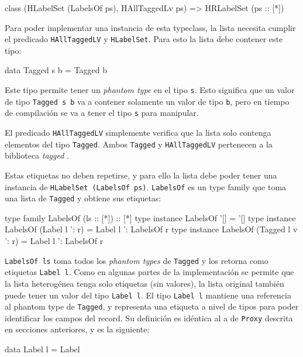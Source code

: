\begin{code}
class (HLabelSet (LabelsOf ps), HAllTaggedLv ps) =>
  HRLabelSet (ps :: [*])
\end{code}

Para poder implementar una instancia de esta typeclass, la lista necesita cumplir el predicado \texttt{HAllTaggedLV} y \texttt{HLabelSet}. Para esto la lista debe contener este tipo:

\begin{code}
data Tagged s b = Tagged b
\end{code}

Este tipo permite tener un \textit{phantom type} en el tipo \texttt{s}. Esto significa que un valor de tipo \texttt{Tagged s b} va a contener solamente un valor de tipo \texttt{b}, pero en tiempo de compilación se va a tener el tipo \texttt{s} para manipular.

El predicado \texttt{HAllTaggedLV} simplemente verifica que la lista solo contenga elementos del tipo \texttt{Tagged}. Ambos \texttt{Tagged} y \texttt{HAllTaggedLV} pertenecen a la biblioteca \textit{tagged} \cite{HaskellTagged}.
 
Estas etiquetas no deben repetirse, y para ello la lista debe poder tener una instancia de \texttt{HLabelSet (LabelsOf ps)}. \texttt{LabelsOf} es un type family que toma una lista de \texttt{Tagged} y obtiene sus etiquetas:

\begin{code}
type family LabelsOf (ls :: [*]) :: [*]
type instance LabelsOf '[] = '[]
type instance LabelsOf (Label l ': r) = 
  Label l ': LabelsOf r
type instance LabelsOf (Tagged l v ': r) = 
  Label l ': LabelsOf r
\end{code}

\texttt{LabelsOf ls} toma todos los \textit{phantom types} de \texttt{Tagged} y los retorna como etiquetas \texttt{Label l}. Como en algunas partes de la implementación se permite que la lista heterogénea tenga solo etiquetas (sin valores), la lista original también puede tener un valor del tipo \texttt{Label l}. El tipo \texttt{Label l} mantiene una referencia al phantom type de \texttt{Tagged}, y representa una etiqueta a nivel de tipos para poder identificar los campos del record. Su definición es idéntica al a de \texttt{Proxy} descrita en secciones anteriores, y es la siguiente:

\begin{code}
data Label l = Label
\end{code}

